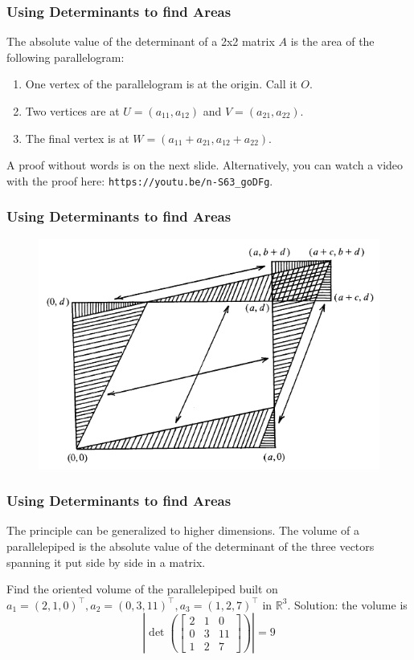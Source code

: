 \documentclass[xcolor=dvipsnames]{beamer}
\begin{document}
\begin{frame}
  \frametitle{Using Determinants to find Areas}
  The absolute value of the determinant of a 2x2 matrix $A$ is the
  area of the following parallelogram:
  \begin{enumerate}
  \item One vertex of the parallelogram is at the origin. Call it $O$.
  \item Two vertices are at $U=(a_{11},a_{12})$ and
    $V=(a_{21},a_{22})$.
  \item The final vertex is at $W=(a_{11}+a_{21},a_{12}+a_{22})$.
  \end{enumerate}
  A proof without words is on the next slide. Alternatively, you can
  watch a video with the proof here:
  \texttt{https://youtu.be/n-S63\_goDFg}.
\end{frame}

\begin{frame}
  \frametitle{Using Determinants to find Areas}
    \begin{figure}[h]
    \includegraphics[scale=.5]{./diagrams/pardet1.png}
  \end{figure}
\end{frame}

\begin{frame}
  \frametitle{Using Determinants to find Areas}
  The principle can be generalized to higher dimensions. The volume of
  a parallelepiped is the absolute value of the determinant of the
  three vectors spanning it put side by side in a matrix.

\medskip

   Find the oriented volume of the
  parallelepiped built on
  $a_{1}=(2,1,0)^{\intercal},a_{2}=(0,3,11)^{\intercal},a_{3}=(1,2,7)^{\intercal}$
  in $\mathbb{R}^{3}$.
  Solution: the volume is
  \begin{equation}
    \label{eq:waixaimi}
    \left\vert\det\left(\left[
        \begin{array}{ccc}
          2 & 1 & 0 \\
          0 & 3 & 11 \\
          1 & 2 & 7
        \end{array}\right]\right)\right\vert=9
  \end{equation}
\end{frame}
\end{document}
